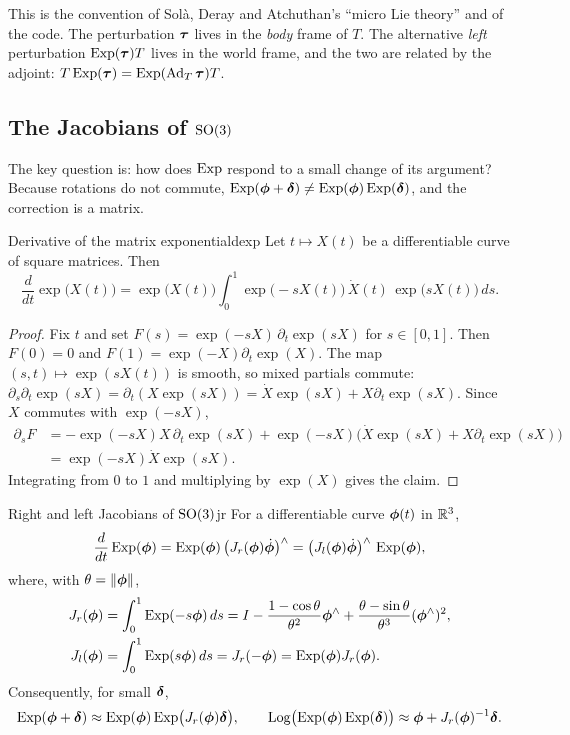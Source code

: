 This is the convention of Sol\`a, Deray and Atchuthan's ``micro Lie
theory'' and of the code. The perturbation $\bm{\tau}$ lives in the
\emph{body} frame of $T$. The alternative \emph{left} perturbation
$\operatorname{Exp}(\bm{\tau})T$ lives in the world frame, and the two are related by
the adjoint: $T\operatorname{Exp}(\bm{\tau})=\operatorname{Exp}(\operatorname{Ad}_T\bm{\tau})T$.

\subsection{The Jacobians of $\mathrm{SO}(3)$}

The key question is: how does $\operatorname{Exp}$ respond to a small change of its
argument? Because rotations do not commute,
$\operatorname{Exp}(\bm{\phi}+\bm{\delta})\neq\operatorname{Exp}(\bm{\phi})\operatorname{Exp}(\bm{\delta})$, and the
correction is a matrix.

\begin{lemma}{Derivative of the matrix exponential}{dexp}
Let $t\mapsto X(t)$ be a differentiable curve of square matrices. Then
\[
\frac{d}{dt}\exp\bigl(X(t)\bigr)=\exp\bigl(X(t)\bigr)\int_0^1
\exp\bigl(-sX(t)\bigr)\,\dot X(t)\,\exp\bigl(sX(t)\bigr)\,ds .
\]
\end{lemma}

\begin{proof}
Fix $t$ and set $F(s)=\exp(-sX)\,\partial_t\exp(sX)$ for $s\in[0,1]$.
Then $F(0)=0$ and $F(1)=\exp(-X)\partial_t\exp(X)$. The map
$(s,t)\mapsto\exp(sX(t))$ is smooth, so mixed partials commute:
$\partial_s\partial_t\exp(sX)=\partial_t(X\exp(sX))=\dot X\exp(sX)+
X\partial_t\exp(sX)$. Since $X$ commutes with $\exp(-sX)$,
\begin{align*}
\partial_sF&=-\exp(-sX)X\,\partial_t\exp(sX)+\exp(-sX)\bigl(\dot X
\exp(sX)+X\partial_t\exp(sX)\bigr)\\
&=\exp(-sX)\dot X\exp(sX).
\end{align*}
Integrating from $0$ to $1$ and multiplying by $\exp(X)$ gives the claim.
\end{proof}

\begin{theorem}{Right and left Jacobians of $\mathrm{SO}(3)$}{jr}
For a differentiable curve $\bm{\phi}(t)$ in $\mathbb{R}^3$,
\[
\frac{d}{dt}\operatorname{Exp}(\bm{\phi})=\operatorname{Exp}(\bm{\phi})\,\bigl(J_r(\bm{\phi})\dot{\bm{\phi}}
\bigr)^{\wedge}=\bigl(J_l(\bm{\phi})\dot{\bm{\phi}}\bigr)^{\wedge}\,\operatorname{Exp}(\bm{\phi}),
\]
where, with $\theta=\left\lVert \bm{\phi}\right\rVert$,
\begin{align}
J_r(\bm{\phi})&=\int_0^1\operatorname{Exp}(-s\bm{\phi})\,ds
 =I-\frac{1-\cos\theta}{\theta^2}\bm{\phi}^{\wedge}
 +\frac{\theta-\sin\theta}{\theta^3}(\bm{\phi}^{\wedge})^2,\label{eq:jr}\\
J_l(\bm{\phi})&=\int_0^1\operatorname{Exp}(s\bm{\phi})\,ds=J_r(-\bm{\phi})
 =\operatorname{Exp}(\bm{\phi})J_r(\bm{\phi}).\label{eq:jl}
\end{align}
Consequently, for small $\bm{\delta}$,
\begin{equation}\label{eq:bch1}
\operatorname{Exp}(\bm{\phi}+\bm{\delta})\approx\operatorname{Exp}(\bm{\phi})\operatorname{Exp}\bigl(J_r(\bm{\phi})
\bm{\delta}\bigr),\qquad
\operatorname{Log}\bigl(\operatorname{Exp}(\bm{\phi})\operatorname{Exp}(\bm{\delta})\bigr)\approx
\bm{\phi}+J_r(\bm{\phi})^{-1}\bm{\delta} .
\end{equation}
\end{theorem}

